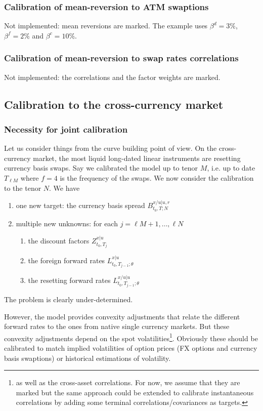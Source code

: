\documentclass[11pt,english]{amsart}
\newcommand{\f}{\ell}
\theoremstyle{definition}
\begin{document}
\subsubsection{Calibration of mean-reversion to ATM swaptions}%
Not implemented: mean reversions are marked. The example uses $\beta^d = 3\%$, $\beta^f = 2\%$ and $\beta^c = 10\%$.

\subsubsection{Calibration of mean-reversion to swap rates correlations}%
Not implemented: the correlations and the factor weights are marked.


\newpage%
\subsection{Calibration to the cross-currency market}


\subsubsection{Necessity for joint calibration}%
Let us consider things from the curve building point of view. On the cross-currency market, the most liquid long-dated linear instruments are resetting currency basis swaps. Say we calibrated the model up to tenor $M$, i.e. up to date $T_{\f M}$ where $f = 4$ is the frequency of the swaps.  We now consider the calibration to the tenor $N$. We have
\begin{enumerate}
\item one new target: the currency basis spread $B^{x/u|u,r}_{t_0,T;N}$
\item multiple new unknowns: for each $j=\f M+1,\ldots,\f N$
\begin{enumerate}
\item the discount factors $Z^{x|u}_{t_0,T_j}$
\item the foreign forward rates $L^{x|u}_{t_0,T_{j-1};\theta}$
\item the resetting forward rates $L^{x/u|u}_{t_0,T_{j-1};\theta}$
\end{enumerate}
\end{enumerate}
The problem is clearly under-determined.

However, the model provides convexity adjustments that relate the different forward rates to the ones from native single currency markets. But these convexity adjustments depend on the spot volatilities\footnote{as well as the cross-asset correlations. For now, we assume that they are marked but the same approach could be extended to calibrate instantaneous correlations by adding some terminal correlations/covariances as targets.}. Obviously these should be calibrated to match implied volatilities of option prices (FX options and currency basis swaptions) or historical estimations of volatility.
\end{document}
